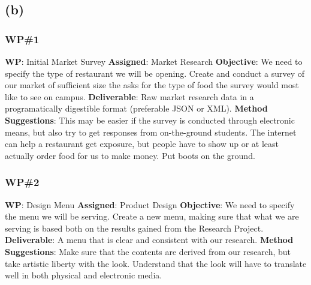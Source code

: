 \documentclass{article}
\begin{document}
	\begin{center}
		
	\end{center}
	
	\subsection*{\quad(b)}
	\subsubsection*{WP\#1}
		\textbf{WP}: Initial Market Survey\newline
		\textbf{Assigned}: Market Research\newline
		\textbf{Objective}: We need to specify the type of restaurant we will be opening. Create and conduct a survey of our market of sufficient size the asks for the type of food the survey would most like to see on campus.\newline
		\textbf{Deliverable}: Raw market research data in a programatically digestible format (preferable JSON or XML).\newline
		\textbf{Method Suggestions}: This may be easier if the survey is conducted through electronic means, but also try to get responses from on-the-ground students. The internet can help a restaurant get exposure, but people 			have to show up or at least actually order food for us to make money. Put boots on the ground.\newline
	\subsubsection*{WP\#2}
		\textbf{WP}: Design Menu\newline
		\textbf{Assigned}: Product Design\newline
		\textbf{Objective}: We need to specify the menu we will be serving. Create a new menu, making sure that what we are serving is based both on the results gained from the Research Project.\newline
		\textbf{Deliverable}: A menu that is clear and consistent with our research.\newline
		\textbf{Method Suggestions}: Make sure that the contents are derived from our research, but take artistic liberty with the look. Understand that the look will have to translate well in both physical and electronic media.\newline
\end{document}
